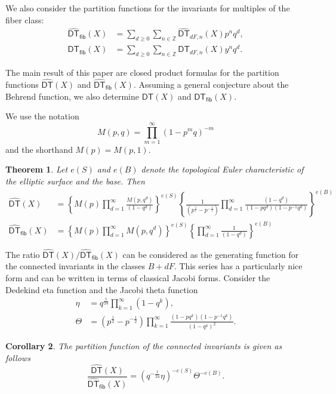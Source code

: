 \documentclass{amsart}
\newtheorem{theorem}{Theorem}%
\newtheorem{corollary}[theorem]{Corollary}
\theoremstyle{definition}
\newcommand{\ZZ} {\mathbb{Z}}		%
\newcommand{\DT}{\mathsf{DT}}
\newcommand{\DThat}{\widehat{\DT}}
\newcommand{\fiber}{\mathsf{fib}}
\newcommand{\half}{\frac{1}{2}}
\begin{document}
We also consider the partition functions for the invariants for
multiples of the fiber class:
\begin{align*}
\DThat_{\fiber}(X)& = \sum_{d\geq 0} \sum_{n \in \ZZ} \DThat_{dF,n}(X) p^{n} q^{d} ,\\
\DT_{\fiber}(X)& = \sum_{d\geq 0} \sum_{n \in \ZZ} \DT_{dF,n}(X) y^{n} q^{d} .
\end{align*}


The main result of this paper are closed product formulas for the
partition functions $\DThat (X)$ and $\DThat_{\fiber}(X)$. Assuming a
general conjecture about the Behrend function, we also determine $\DT
(X)$ and $\DT_{\fiber}(X)$.

We use the notation
\[
M(p,q) = \prod_{m=1}^{\infty} (1-p^{m}q)^{-m}
\]
and the shorthand $M(p)=M(p,1)$.

\begin{theorem}\label{thm: main thm -- formulas for DT and DTfiber}
Let $e(S)$ and $e(B)$ denote the topological Euler characteristic of
the elliptic surface and the base. Then
\begin{align*}
\DThat (X) &= \left \{M(p)\prod_{d=1}^{\infty}
\frac{M(p,q^{d})}{(1-q^{d})} \right\}^{e(S)}
\left\{\frac{1}{(p^{\half}-p^{-\half})}\prod_{d=1}^{\infty}\frac{(1-q^{d})}{(1-pq^{d})(1-p^{-1}q^{d})}
\right\}^{e(B)} \\
\DThat_{\fiber}(X) &= \left\{M(p)\prod_{d=1}^{\infty}M(p,q^{d})
\right\}^{e(S)} \left\{\prod_{d=1}^{\infty}\frac{1}{(1-q^{d})}
\right\}^{e(B)}
\end{align*}
\end{theorem}


The ratio $\DThat (X)/\DThat_{\fiber}(X)$ can be considered as the
generating function for the connected invariants in the classes
$B+dF$. This series has a particularly nice form and can be written in
terms of classical Jacobi forms.  Consider the Dedekind eta function
and the Jacobi theta function
\begin{align*}
\eta &= q^{\frac{1}{24}} \prod_{k=1}^{\infty}(1-q^k), \\
\Theta &= 
(p^{\frac{1}{2}} - p^{-\frac{1}{2}}) \prod_{k=1}^{\infty} \frac{(1-p q^k) (1-p^{-1} q^k)}{(1-q^k)^2}.
\end{align*}

\begin{corollary} The partition function of the connected invariants is given as follows
\[
\frac{\DThat (X)}{\DThat_{\fiber}(X)}=
\left(q^{-\frac{1}{24}}\eta  \right)^{-e(S)}\Theta^{-e(B)}.
\]
\end{corollary}
\end{document}
